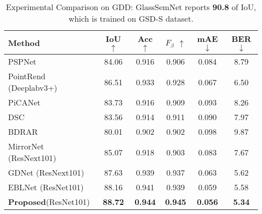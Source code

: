 \documentclass[10pt,twocolumn,letterpaper]{article}
\begin{document}
\begin{table}\scriptsize
    \centering
    \begin{tabular}{lccccc} %
    \toprule
    Method & IoU $\uparrow$ & Acc $\uparrow$ &${F}_{\beta}$ $\uparrow$ & mAE $\downarrow$ &BER $\downarrow$ \\
    \midrule
    PSPNet \cite{zhao2017pyramid}    &84.06 &0.916 &0.906& 0.084 &8.79\\
    PointRend \cite{kirillov2020pointrend} (Deeplabv3+) & 86.51 &0.933&0.928 & 0.067& 6.50\\
    PiCANet \cite{liu2018picanet}   &83.73 &0.916&0.909 & 0.093 &8.26\\
    DSC \cite{hu2018direction} &83.56 & 0.914  &0.911   & 0.090 & 7.97\\
    BDRAR \cite{zhu2018bidirectional}  &80.01 & 0.902 &0.902    & 0.098 & 9.87\\
    MirrorNet \cite{yang2019my} (ResNext101)&85.07 & 0.918 &0.903    & 0.083 & 7.67\\
    GDNet \cite{mei2020don} (ResNext101) &87.63 & 0.939 &0.937 & 0.063 & 5.62\\
    EBLNet \cite{he2021enhanced} (ResNet101) & 88.16 & 0.941  &0.939   & 0.059 & 5.58\\
    \midrule
    \textbf{Proposed}(ResNet101) & \textbf{88.72} &\textbf{0.944} &\textbf{0.945}&\textbf{ 0.056} & \textbf{5.34}\\
    \bottomrule
    \end{tabular}
            \vspace*{-2mm}
    \caption{Experimental Comparison on GDD: GlassSemNet\cite{linexploiting} reports \textbf{90.8} of IoU, which is trained on GSD-S dataset.}
            \vspace*{-1mm}
    \label{GDD}
\end{table}
\end{document}
